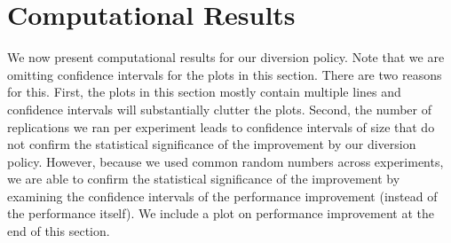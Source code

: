 \section{Computational Results}

We now present computational results for our diversion policy. Note that
we are omitting confidence intervals for the plots in this section. There
are two reasons for this. First, the plots in this section mostly
contain multiple lines and confidence intervals will substantially clutter
the plots. Second, the number of replications we ran per experiment
leads to confidence intervals of size that do not confirm the statistical
significance of the improvement by our diversion policy. However, because
we used common random numbers across experiments, we are able to confirm
the statistical significance of the improvement by examining the confidence
intervals of the performance improvement (instead of the performance itself).
We include a plot on performance improvement at the end of this section.




